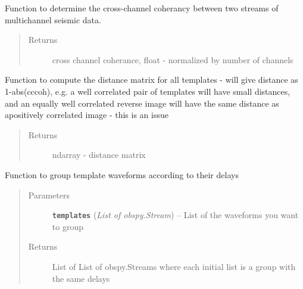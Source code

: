 \documentclass[a4paper,10pt,english]{sphinxmanual}
\begin{document}
\begin{fulllineitems}
\label{modules:clustering.cross_chan_coherance}
Function to determine the cross-channel coherancy between two streams of
multichannel seismic data.
\begin{quote}\begin{description}
\item[{Returns}] \leavevmode
cross channel coherance, float - normalized by number of channels

\end{description}\end{quote}

\end{fulllineitems}


\begin{fulllineitems}
\label{modules:clustering.distance_matrix}
Function to compute the distance matrix for all templates - will give
distance as 1-abs(cccoh), e.g. a well correlated pair of templates will
have small distances, and an equally well correlated reverse image will
have the same distance as apositively correlated image - this is an issue
\begin{quote}\begin{description}
\item[{Returns}] \leavevmode
ndarray - distance matrix

\end{description}\end{quote}

\end{fulllineitems}


\begin{fulllineitems}
\label{modules:clustering.group_delays}
Function to group template waveforms according to their delays
\begin{quote}\begin{description}
\item[{Parameters}] \leavevmode
\textbf{\texttt{templates}} (\emph{List of obspy.Stream}) -- List of the waveforms you want to group

\item[{Returns}] \leavevmode
List of List of obspy.Streams where each initial list is a group
with the same delays

\end{description}\end{quote}

\end{fulllineitems}
\end{document}
